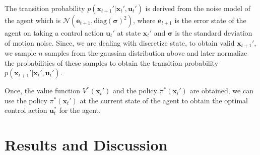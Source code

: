 \documentclass[conference]{IEEEtran}
\begin{document}
The transition probability $p(\mathbf{x}_{t+1}' | \mathbf{x}_t', \mathbf{u}_t')$ is derived from the 
noise model of the agent which is $\mathcal{N}(\mathbf{e}_{t+1}, \text{diag}(\mathbf{\sigma})^2)$, where 
$\mathbf{e}_{t+1}$ is the error state of the agent on taking a control action $\mathbf{u}_t'$ at state $\mathbf{x}_t'$ and $\mathbf{\sigma}$ is the standard deviation of motion noise. 
Since, we are dealing with discretize state, to obtain valid $\mathbf{x}_{t+1}'$, we sample $n$ samples from the gaussian distribution above and later
normalize the probabilities of these samples to obtain the transition probability $p(\mathbf{x}_{t+1}' | \mathbf{x}_t', \mathbf{u}_t')$.

Once, the value function $V^*(\mathbf{x}_t')$ and the policy $\pi^*(\mathbf{x}_t')$ are obtained, we can use the policy $\pi^*(\mathbf{x}_t')$ at the current state of the agent to obtain the optimal control action $\mathbf{u}_t^*$ for the agent.
\section{Results and Discussion}
\end{document}

